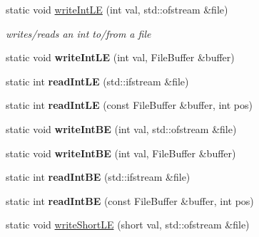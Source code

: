 \begin{DoxyCompactItemize}
\item 
\mbox{\label{classnta_1_1IOManager_ad6ed0ff2efedb9388641d9456fd215b5}} 
static void \hyperlink{classnta_1_1IOManager_ad6ed0ff2efedb9388641d9456fd215b5}{write\+Int\+LE} (int val, std\+::ofstream \&file)
\begin{DoxyCompactList}\small\item\em writes/reads an int to/from a file \end{DoxyCompactList}\item 
\mbox{\label{classnta_1_1IOManager_a83cc5430e709fddd4db99c563078f257}} 
static void {\bfseries write\+Int\+LE} (int val, File\+Buffer \&buffer)
\item 
\mbox{\label{classnta_1_1IOManager_ac28bb1e7b2643c99635939be2db5d35e}} 
static int {\bfseries read\+Int\+LE} (std\+::ifstream \&file)
\item 
\mbox{\label{classnta_1_1IOManager_abc104299f21748dc3e58be173ded744a}} 
static int {\bfseries read\+Int\+LE} (const File\+Buffer \&buffer, int pos)
\item 
\mbox{\label{classnta_1_1IOManager_a18ec253cf29a9457b00f227b8d380a24}} 
static void {\bfseries write\+Int\+BE} (int val, std\+::ofstream \&file)
\item 
\mbox{\label{classnta_1_1IOManager_ac6f46b1b1043bd7fa0cfc9c0c9e5aeee}} 
static void {\bfseries write\+Int\+BE} (int val, File\+Buffer \&buffer)
\item 
\mbox{\label{classnta_1_1IOManager_af56979a1069b35d72c69649a13eadef1}} 
static int {\bfseries read\+Int\+BE} (std\+::ifstream \&file)
\item 
\mbox{\label{classnta_1_1IOManager_a0a12d9ea5f6b1e4f242ca87301650445}} 
static int {\bfseries read\+Int\+BE} (const File\+Buffer \&buffer, int pos)
\item 
\mbox{\label{classnta_1_1IOManager_aa9d8d060c137fddc3880ce7dae7f23bf}} 
static void \hyperlink{classnta_1_1IOManager_aa9d8d060c137fddc3880ce7dae7f23bf}{write\+Short\+LE} (short val, std\+::ofstream \&file)

\end{DoxyCompactItemize}
